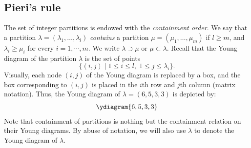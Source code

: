 \documentclass[11pt]{amsart}
\theoremstyle{definition}
\theoremstyle{example}
\begin{document}
\subsection{Pieri's rule}
\label{sec:pieri}
The set of integer partitions is endowed with the \emph{containment order}.
We say that a partition $\lambda=(\lambda_1,\dotsc,\lambda_l)$ \emph{contains} a partition $\mu=(\mu_1,\dotsc, \mu_m)$ if $l \geq m$, and $\lambda_i\geq \mu_i$ for every $i=1,\dotsb, m$.
We write $\lambda\supset\mu$ or $\mu \subset \lambda$.
Recall that the Young diagram of the partition $\lambda$ is the set of points 
\begin{displaymath}
\{(i, j)\mid 1\leq i\leq l,\; 1\leq j\leq \lambda_i\}.
\end{displaymath}
Visually, each node $(i,j)$ of the Young diagram is replaced by a box, and the box corresponding to $(i,j)$ is placed in the $i$th row and $j$th column (matrix notation).
Thus, the Young diagram of $\lambda=(6, 5, 3, 3)$ is depicted by:
\begin{displaymath}
  \ydiagram{6,5,3,3}
\end{displaymath}
Note that containment of partitions is nothing but the containment relation on their Young diagrams.
By abuse of notation, we will also use $\lambda$ to denote the Young diagram of $\lambda$.
\end{document}
